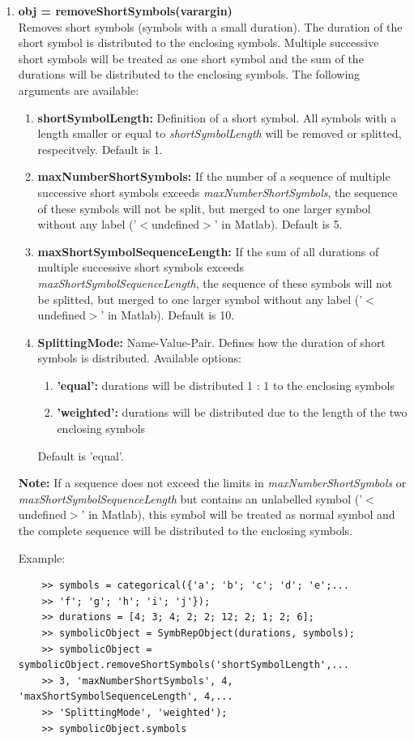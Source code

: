 \documentclass[a4]{scrreprt}
\begin{document}
\begin{enumerate}
	\item \textbf{obj = removeShortSymbols(varargin)}\\
	Removes short symbols (symbols with a small duration). The duration of the short symbol is distributed to the enclosing symbols. Multiple successive short symbols will be treated as one short symbol and the sum of the durations will be distributed to the enclosing symbols. The following arguments are available:
	\begin{enumerate}
		\item \textbf{shortSymbolLength: } Definition of a short symbol. All symbols with a length smaller or equal to \textit{shortSymbolLength} will be removed or splitted, respecitvely. Default is 1.
		\item \textbf{maxNumberShortSymbols: } If the number of a sequence of multiple successive short symbols exceeds \textit{maxNumberShortSymbols}, the sequence of these symbols will not be split, but merged to one larger symbol without any label ('$<$undefined$>$' in Matlab). Default is 5.
		\item \textbf{maxShortSymbolSequenceLength: } If the sum of all durations of multiple successive short symbols exceeds \textit{maxShortSymbolSequenceLength}, the sequence of these symbols will not be splitted, but merged to one larger symbol without any label ('$<$undefined$>$' in Matlab). Default is 10.
		\item \textbf{SplittingMode: } Name-Value-Pair. Defines how the duration of short symbols is distributed. Available options: 
		\begin{enumerate}
			\item \textbf{'equal':} durations will be distributed 1 : 1 to the enclosing symbols
			\item \textbf{'weighted':} durations will be distributed due to the length of the two enclosing symbols
		\end{enumerate}
		Default is 'equal'.	
	\end{enumerate}

	\textbf{Note:} If a sequence does not exceed the limits in \textit{maxNumberShortSymbols} or \textit{maxShortSymbolSequenceLength} but contains an unlabelled symbol ('$<$undefined$>$' in Matlab), this symbol will be treated as normal symbol and the complete sequence will be distributed to the enclosing symbols.

    Example:
    
    \begin{verbatim}
    >> symbols = categorical({'a'; 'b'; 'c'; 'd'; 'e';...
    >> 'f'; 'g'; 'h'; 'i'; 'j'});
    >> durations = [4; 3; 4; 2; 2; 12; 2; 1; 2; 6];
    >> symbolicObject = SymbRepObject(durations, symbols);
    >> symbolicObject = symbolicObject.removeShortSymbols('shortSymbolLength',...
    >> 3, 'maxNumberShortSymbols', 4, 'maxShortSymbolSequenceLength', 4,...
    >> 'SplittingMode', 'weighted');
    >> symbolicObject.symbols
    

\end{verbatim}
\end{enumerate}
\end{document}
